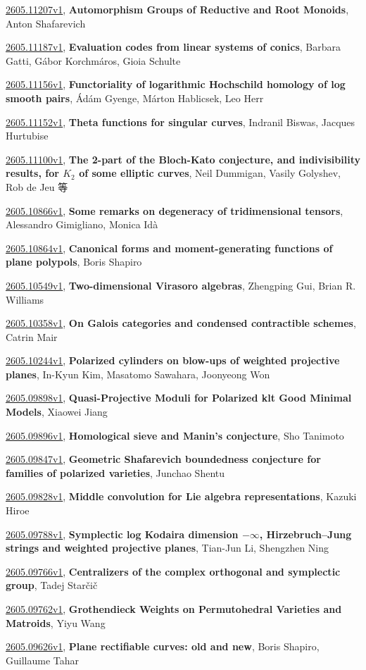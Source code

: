 \documentclass[9pt, a4paper]{article}
\theoremstyle{plain}
\theoremstyle{definition}
\theoremstyle{remark}
\newcommand{\arxiv}[3]{\href{https://arxiv.org/abs/#1}{#1}, \textbf{\textcolor{arxivblue}{#2}}, #3}
\begin{document}
\arxiv{2605.11207v1}{Automorphism Groups of Reductive and Root Monoids}{Anton Shafarevich}

\arxiv{2605.11187v1}{Evaluation codes from linear systems of conics}{Barbara Gatti, Gábor Korchmáros, Gioia Schulte}

\arxiv{2605.11156v1}{Functoriality of logarithmic Hochschild homology of log smooth pairs}{Ádám Gyenge, Márton Hablicsek, Leo Herr}

\arxiv{2605.11152v1}{Theta functions for singular curves}{Indranil Biswas, Jacques Hurtubise}

\arxiv{2605.11100v1}{The 2-part of the Bloch-Kato conjecture, and indivisibility results, for $K_2$ of some elliptic curves}{Neil Dummigan, Vasily Golyshev, Rob de Jeu 等}

\arxiv{2605.10866v1}{Some remarks on degeneracy of tridimensional tensors}{Alessandro Gimigliano, Monica Idà}

\arxiv{2605.10864v1}{Canonical forms and moment-generating functions of plane polypols}{Boris Shapiro}

\arxiv{2605.10549v1}{Two-dimensional Virasoro algebras}{Zhengping Gui, Brian R. Williams}

\arxiv{2605.10358v1}{On Galois categories and condensed contractible schemes}{Catrin Mair}

\arxiv{2605.10244v1}{Polarized cylinders on blow-ups of weighted projective planes}{In-Kyun Kim, Masatomo Sawahara, Joonyeong Won}

\arxiv{2605.09898v1}{Quasi-Projective Moduli for Polarized klt Good Minimal Models}{Xiaowei Jiang}

\arxiv{2605.09896v1}{Homological sieve and Manin's conjecture}{Sho Tanimoto}

\arxiv{2605.09847v1}{Geometric Shafarevich boundedness conjecture for families of polarized varieties}{Junchao Shentu}

\arxiv{2605.09828v1}{Middle convolution for Lie algebra representations}{Kazuki Hiroe}

\arxiv{2605.09788v1}{Symplectic log Kodaira dimension $-\infty$, Hirzebruch--Jung strings and weighted projective planes}{Tian-Jun Li, Shengzhen Ning}

\arxiv{2605.09766v1}{Centralizers of the complex orthogonal and symplectic group}{Tadej Starčič}

\arxiv{2605.09762v1}{Grothendieck Weights on Permutohedral Varieties and Matroids}{Yiyu Wang}

\arxiv{2605.09626v1}{Plane rectifiable curves: old and new}{Boris Shapiro, Guillaume Tahar}
\end{document}
